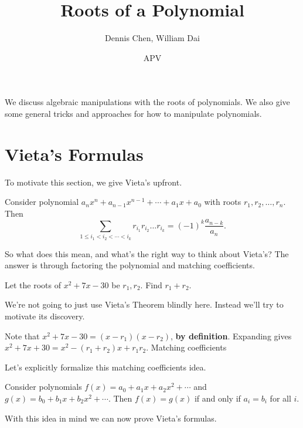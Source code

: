 \documentclass[mast]{lucky}
\title{Roots of a Polynomial}
\author{Dennis Chen, William Dai}
\date{APV}
\begin{document}
\maketitle

We discuss algebraic manipulations with the roots of polynomials. We also give some general tricks and approaches for how to manipulate polynomials.

\section{Vieta's Formulas}
To motivate this section, we give Vieta's upfront.

\begin{theo}
Consider polynomial $a_nx^n+a_{n-1}x^{n-1}+\cdots+a_{1}x+a_0$ with roots $r_1,r_2,\ldots,r_n.$ Then
\[\sum\limits_{1\leq i_1<i_2<\cdots<i_k}r_{i_1}r_{i_2}\ldots r_{i_k}=(-1)^k\frac{a_{n-k}}{a_n}.\]
\end{theo}

So what does this mean, and what's the right way to think about Vieta's? The answer is through factoring the polynomial and matching coefficients.

\begin{exam}[Quadratic]
Let the roots of $x^2+7x-30$ be $r_1,r_2.$ Find $r_1+r_2.$
\end{exam}

We're not going to just use Vieta's Theorem blindly here. Instead we'll try to motivate its discovery.

\begin{sol}
Note that $x^2+7x-30=(x-r_1)(x-r_2)$, \textbf{by definition}. Expanding gives $x^2+7x+30=x^2-(r_1+r_2)x+r_1r_2.$ Matching coefficients
\end{sol}

Let's explicitly formalize this matching coefficients idea.

\begin{theo}
Consider polynomials $f(x)=a_0+a_1x+a_2x^2+\cdots$ and $g(x)=b_0+b_1x+b_2x^2+\cdots.$ Then $f(x)=g(x)$ if and only if $a_i=b_i$ for all $i.$\footnotemark
\end{theo}


With this idea in mind we can now prove Vieta's formulas.
\end{document}
